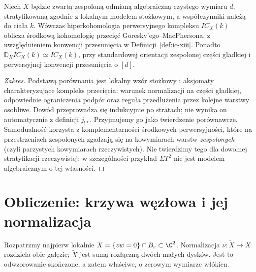 \begin{twierdzenie}
\label{thm:ic-comparison-xiii}
Niech $X$ będzie zwartą zespoloną odmianą
algebraiczną czystego wymiaru $d$,
stratyfikowaną zgodnie z lokalnym modelem stożkowym,
a współczynniki należą do ciała $k$.
Wówczas hiperkohomologia perwersyjnego kompleksu
$IC_X(k)$ oblicza środkową kohomologię przecięć
Goresky'ego--MacPhersona, z uwzględnieniem
konwencji przesunięcia w Definicji~\ref{def:ic-xiii}.
Ponadto $\mathbb D_XIC_X(k)\simeq IC_X(k)$,
przy standardowej orientacji zespolonej części gładkiej
i perwersyjnej konwencji przesunięcia o $[d]$.
\end{twierdzenie}
\begin{proof}[Zakres]
Podstawą porównania jest lokalny wzór stożkowy
i aksjomaty charakteryzujące kompleks przecięcia:
warunek normalizacji na części gładkiej,
odpowiednie ograniczenia podpór oraz reguła
przedłużenia przez kolejne warstwy osobliwe.
Dowód przeprowadza się indukcyjnie po stratach;
nie wynika on automatycznie z definicji $j_{!*}$.
Przyjmujemy go jako twierdzenie porównawcze.
Samodualność korzysta z komplementarności
środkowych perwersyjności, które na przestrzeniach
zespolonych zgadzają się na kowymiarach warstw
\emph{zespolonych} (czyli parzystych kowymiarach
rzeczywistych). Nie twierdzimy tego dla dowolnej
stratyfikacji rzeczywistej; w szczególności
przykład $\Sigma T^2$ nie jest modelem
algebraicznym o tej własności.
\end{proof}

\section{Obliczenie: krzywa węzłowa i jej normalizacja}
\label{sec:nodal-perverse-xiii}
Rozpatrzmy najpierw lokalnie
$X=\{zw=0\}\cap B_\varepsilon\subset\C^2$.
Normalizacja $\nu:\widetilde X\to X$ rozdziela
obie gałęzie; $\widetilde X$ jest sumą rozłączną
dwóch małych dysków. Jest to odwzorowanie skończone,
a zatem właściwe, o zerowym wymiarze włókien.


